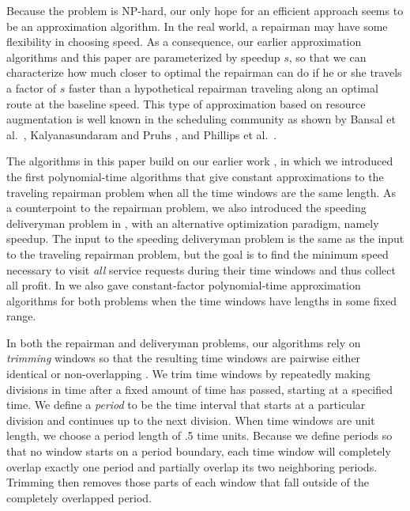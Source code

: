 \documentclass[11pt]{article}
\begin{document}
Because the problem is NP-hard, our only hope for an efficient approach seems to be an approximation algorithm.
In the real world, a repairman may have some flexibility in choosing speed.  As a consequence, our earlier approximation algorithms \cite{Frederickson5} and this paper are parameterized by speedup $s$, so that we can characterize how much closer to optimal the repairman can do if he or she travels a factor of $s$ faster than a hypothetical repairman traveling along an optimal route at the baseline speed.  This type of approximation based on resource augmentation is well known in the scheduling community as shown by Bansal et al.~\cite{Bansal2}, Kalyanasundaram and Pruhs \cite{Kalyanasundaram}, and Phillips et al.~\cite{Phillips}.

The algorithms in this paper build on our earlier work \cite{Frederickson3, Frederickson6}, in which we introduced the first polynomial-time algorithms that give constant approximations to the traveling repairman problem when all the time windows are the same length.  As a counterpoint to the repairman problem, we also introduced the speeding deliveryman problem in \cite{Frederickson3, Frederickson6}, with an alternative optimization paradigm, namely speedup.  The input to the speeding deliveryman problem is the same as the input to the traveling repairman problem, but the goal is to find the minimum speed necessary to visit {\em all} service requests during their time windows and thus collect all profit.  In \cite{Frederickson6} we also gave constant-factor polynomial-time approximation algorithms for both problems when the time windows have lengths in some fixed range.

In both the repairman and deliveryman problems, our algorithms \cite{Frederickson3, Frederickson6} rely on {\em trimming} windows so that the resulting time windows are pairwise either identical or non-overlapping .  We trim time windows by repeatedly making divisions in time after a fixed amount of time has passed, starting at a specified time.  We define a {\em period} to be the time interval that starts at a particular division and continues up to the next division.  When time windows are unit length, we choose a period length of .5 time units.  Because we define periods so that no window starts on a period boundary, each time window will completely overlap exactly one period and partially overlap its two neighboring periods.  Trimming then removes those parts of each window that fall outside of the completely overlapped period.
\end{document}
